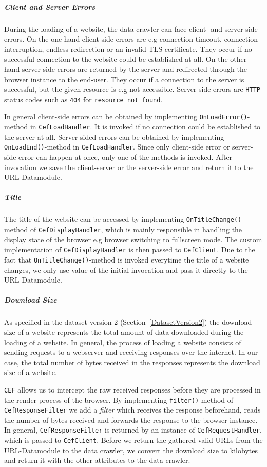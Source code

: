 \subparagraph*{Client and Server Errors}
During the loading of a website, the data crawler can face client- and server-side errors. On the one hand client-side errors are e.g connection timeout, connection interruption, endless redirection or an invalid TLS certificate. They occur if no successful connection to the website could be established at all. On the other hand server-side errors are returned by the server and redirected through the browser instance to the end-user. They occur if a connection to the server is successful, but the given resource is e.g not accessible. Server-side errors are \texttt{HTTP} status codes such as \texttt{404} for \texttt{resource not found}. 

In general client-side errors can be obtained by implementing \texttt{OnLoadError()}-method in \texttt{CefLoadHandler}. It is invoked if no connection could be established to the server at all. Server-sided errors can be obtained by implementing \texttt{OnLoadEnd()}-method in \texttt{CefLoadHandler}. Since only client-side error or server-side error can happen at once, only one of the methods is invoked. After invocation we save the client-server or the server-side error and return it to the URL-Datamodule.

\subparagraph*{Title}
The title of the website can be accessed by implementing \texttt{OnTitleChange()}-method of \texttt{CefDisplayHandler}, which is mainly responsible in handling the display state of the browser e.g browser switching to fullscreen mode. The custom implementation of \texttt{CefDisplayHandler} is then passed to \texttt{CefClient}. Due to the fact that \texttt{OnTitleChange()}-method is invoked everytime the title of a website changes, we only use value of the initial invocation and pass it directly to the URL-Datamodule.

\subparagraph*{Download Size}
As specified in the dataset version 2 (Section~\ref{DatasetVersion2}) the download size of a website represents the total amount of data downloaded during the loading of a website. In general, the process of loading a website consists of sending requests to a webserver and receiving responses over the internet. In our case, the total number of bytes received in the responses represents the download size of a website.

\texttt{CEF} allows us to intercept the raw received responses before they are processed in the render-process of the browser. By implementing \texttt{filter()}-method of \texttt{CefResponseFilter} we add a \textit{filter} which receives the response beforehand, reads the number of bytes received and forwards the response to the browser-instance. In general, \texttt{CefResponseFilter} is returned by an instance of \texttt{CefRequestHandler}, which is passed to \texttt{CefClient}. Before we return the gathered valid URLs from the URL-Datamodule to the data crawler, we convert the download size to kilobytes and return it with the other attributes to the data crawler.

